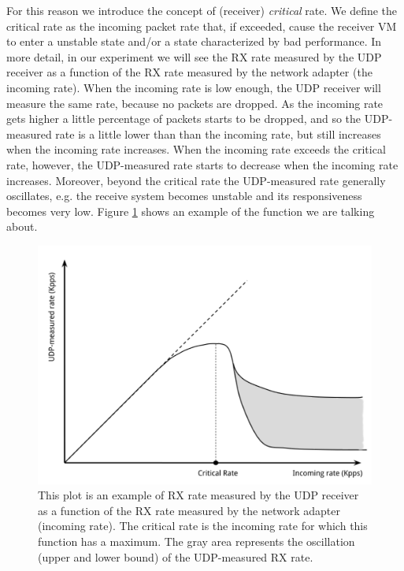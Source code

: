 \vspace{0.5cm}

For this reason we introduce the concept of (receiver) \emph{critical} rate. We define the critical rate as the incoming packet rate that,
if exceeded, cause the receiver VM to enter a unstable state and/or a state characterized by bad performance. In more detail, in our
experiment we will see the RX rate measured by the UDP receiver as a function of the RX rate measured by the network adapter (the incoming 
rate).
When the incoming rate is low enough, the UDP receiver will measure the same rate, because no packets are dropped. As the incoming rate gets
higher a little percentage of packets starts to be dropped, and so the UDP-measured rate is a little lower than than the incoming rate, but
still increases when the incoming rate increases. When the incoming rate exceeds the critical rate, however, the UDP-measured rate starts
to decrease when the incoming rate increases. Moreover, beyond the critical rate the UDP-measured rate generally oscillates, e.g. the
receive system becomes unstable and its responsiveness becomes very low.
Figure \ref{fig:cr} shows an example of the function we are talking about.

\begin{figure}[bt]
\centering
\includegraphics[scale = 0.55]{critical-rate.pdf}
\caption{This plot is an example of RX rate measured by the UDP receiver as a function of the RX rate measured by the network adapter
	 (incoming rate).
	 The critical rate is the incoming rate for which this function has a maximum. The gray area represents the oscillation (upper and
	 lower bound) of the UDP-measured RX rate.}
\label{fig:cr}
\end{figure}

